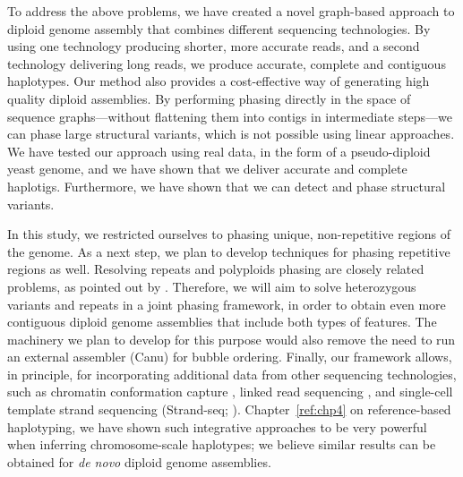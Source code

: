 To address the above problems, we have created a novel graph-based approach to diploid genome assembly that combines different sequencing technologies.
By using one technology producing shorter, more accurate reads, and a second technology delivering long reads, we produce accurate, complete and contiguous haplotypes. 
Our method also provides a cost-effective way of generating high quality diploid assemblies.
By performing phasing directly in the space of sequence graphs---without flattening them into contigs in intermediate steps---we can phase large structural variants, which is not possible using linear approaches. 
We have tested our approach using real data, in the form of a pseudo-diploid yeast genome, and we have shown that we deliver accurate and complete haplotigs.
Furthermore, we have shown that we can detect and phase structural variants.

In this study, we restricted ourselves to phasing unique, non-repetitive regions of the genome.
As a next step, we plan to develop techniques for phasing repetitive regions as well.
Resolving repeats and polyploids phasing are closely related problems, as pointed out by \cite{Chaisson2017}.
Therefore, we will aim to solve heterozygous variants and repeats in a joint phasing framework, in order to obtain even more contiguous diploid genome assemblies that include both types of features.
The machinery we plan to develop for this purpose would also remove the need to run an external assembler (Canu) for bubble ordering.
Finally, our framework allows, in principle, for incorporating additional data from other sequencing technologies, such as chromatin conformation capture \citep{burton2013chromosome}, linked read sequencing \citep{weisenfeld2017direct}, and single-cell template strand sequencing (Strand-seq; \citealp{Porubsky2016}).
Chapter~\ref{ref:chp4} on reference-based haplotyping, we have shown such integrative approaches to be very powerful when inferring chromosome-scale haplotypes; we believe similar results can be obtained for \textit{de novo} diploid genome assemblies.

\bigskip

\begin{center}{\end{center}

